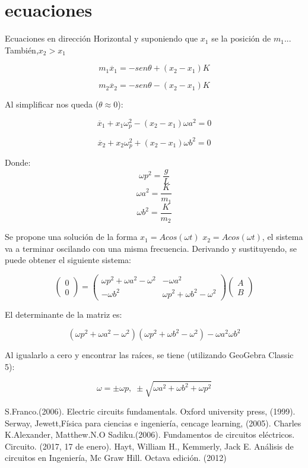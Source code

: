 \documentclass[twocolumn,11pts]{IEEEtran}
\renewcommand{\refname}{Referencias}
\begin{document}
\section{ecuaciones}

Ecuaciones en dirección Horizontal y suponiendo que $x_1$ se la posición de $m_1$... También,$ x_2 > x_1$

\[
m_1 \ddot{x_1}=-sen\theta + (x_2-x_1)K
\]


\[
m_2 \ddot{x_2}=-sen\theta - (x_2-x_1)K
\]

Al simplificar nos queda ($\theta \approx 0$):

\[
\ddot{x_1}+x_1\omega _p^2-(x_2-x_1)\omega a^2=0
\]

\[
\ddot{x_2}+x_2\omega _p^2+(x_2-x_1)\omega b^2=0
\]

Donde:
\[
\omega p^2= \dfrac{g}{L}
\]
\[
\omega a^2=\dfrac{K}{m_1}
\]
\[
\omega b^2=\dfrac{K}{m_2}
\]




Se propone una solución de la forma $x_1=Acos(\omega t) $ $x_2=Acos(\omega t) $, el sistema va a terminar oscilando con una misma frecuencia. Derivando y sustituyendo, se puede obtener el siguiente sistema:

\[
 \left(\begin{array}{c}
 0 \\ 
 0
\end{array}\right)
=
 \left(\begin{array}{cc}
 \omega p^2+\omega a^2-\omega ^2 &-\omega a^2\\ 
 -\omega b^2&  \omega p^2+\omega b^2-\omega ^2
\end{array}\right)
 \left(\begin{array}{cc}
A\\ 
 B
\end{array}\right)
\]

El determinante de la matriz es:

\[
( \omega p^2+\omega a^2-\omega ^2)(\omega p^2+\omega b^2-\omega ^2)-\omega a^2\omega b^2
\]

Al igualarlo a cero y encontrar las raíces, se tiene (utilizando GeoGebra Classic 5):

\[
\omega=\pm \omega p,\; \pm \sqrt{\omega a^2 + \omega b^2 + \omega p^2}
\]

\renewcommand{\refname}{Referencias}

\begin{thebibliography}{5}
 S.Franco.(2006). Electric circuits fundamentals.
Oxford university press, (1999).
 Serway, Jewett,Física para ciencias e ingeniería, cencage learning, (2005).
 Charles K.Alexander, Matthew.N.O Sadiku.(2006). Fundamentos de circuitos eléctricos.
Circuito. (2017, 17 de enero).
 Hayt, William H., Kemmerly, Jack E. Análisis de circuitos en Ingeniería, Mc Graw Hill. Octava edición. (2012)
\end{thebibliography}
\end{document}
